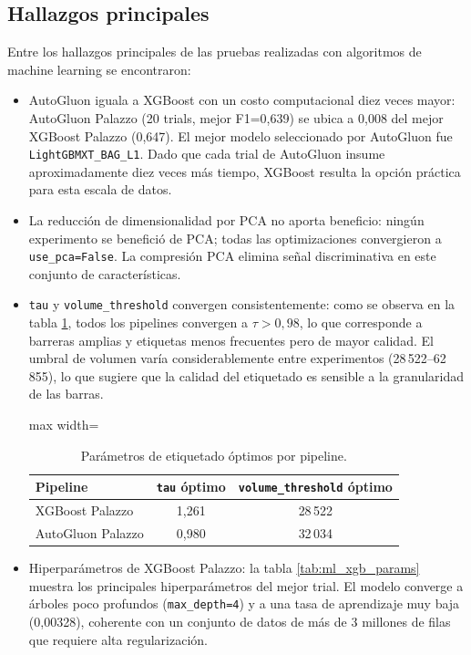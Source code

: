 \subsection{Hallazgos principales}
Entre los hallazgos principales de las pruebas realizadas con algoritmos de machine learning se encontraron:
\begin{itemize}
\item AutoGluon iguala a XGBoost con un costo computacional diez veces mayor: AutoGluon Palazzo (20 trials, mejor F1=0,639) se ubica a 0,008 del mejor XGBoost Palazzo (0,647). El mejor modelo seleccionado por AutoGluon fue \texttt{LightGBMXT\_BAG\_L1}. Dado que cada trial de AutoGluon insume aproximadamente diez veces más tiempo, XGBoost resulta la opción práctica para esta escala de datos.

\item La reducción de dimensionalidad por PCA no aporta beneficio: ningún experimento se benefició de PCA; todas las optimizaciones convergieron a \texttt{use\_pca=False}. La compresión PCA elimina señal discriminativa en este conjunto de características.

\item \texttt{tau} y \texttt{volume\_threshold} convergen consistentemente: como se observa en la tabla \ref{tab:ml_label_params}, todos los pipelines convergen a $\tau > 0,98$, lo que corresponde a barreras amplias y etiquetas menos frecuentes pero de mayor calidad. El umbral de volumen varía considerablemente entre experimentos (28\,522--62\,855), lo que sugiere que la calidad del etiquetado es sensible a la granularidad de las barras.

\begin{table}[H]
    \centering
    \caption[Parámetros de etiquetado óptimos]{Parámetros de etiquetado óptimos por pipeline.}
    \small
    \begin{adjustbox}{max width=\textwidth}
    \begin{tabular}{l c c}
        \toprule
        \textbf{Pipeline} & \textbf{\texttt{tau} óptimo} & \textbf{\texttt{volume\_threshold} óptimo} \\
        \midrule
        XGBoost Palazzo   & 1,261 & 28\,522 \\
        AutoGluon Palazzo & 0,980 & 32\,034 \\
        \bottomrule
    \end{tabular}
    \end{adjustbox}
    \label{tab:ml_label_params}
\end{table}

\item Hiperparámetros de XGBoost Palazzo: la tabla \ref{tab:ml_xgb_params} muestra los principales hiperparámetros del mejor trial. El modelo converge a árboles poco profundos (\texttt{max\_depth=4}) y a una tasa de aprendizaje muy baja (0,00328), coherente con un conjunto de datos de más de 3 millones de filas que requiere alta regularización.

\end{itemize}

